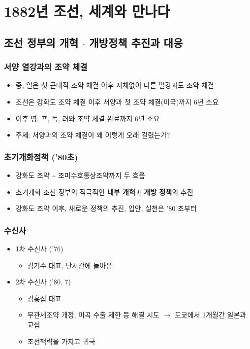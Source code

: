 \section{1882년 조선, 세계와 만나다}

\subsection{조선 정부의 개혁 $\cdot$ 개방정책 추진과 대응}

\subsubsection*{서양 열강과의 조약 체결}
\begin{itemize}
    \item 중, 일은 첫 근대적 조약 체결 이후 지체없이 다른 열강과도 조약 체결
    \item 조선은 강화도 조약 체결 이후 서양과 첫 조약 체결(미국)까지 6년 소요
    \item 이후 영, 프, 독, 러와 조약 체결 완료까지 6년 소요
    \item 주제: 서양과의 조약 체결이 왜 이렇게 오래 걸렸는가?
\end{itemize}

\subsubsection*{초기개화정책 ('80초)}
\begin{itemize}
    \item 강화도 조약 \textasciitilde{} 조미수호통상조약까지 두 흐름
    \item 초기개화 조선 정부의 적극적인 \textbf{내부 개혁}과 \textbf{개방 정책}의 추진
    \item 강화도 조약 이후, 새로운 정책의 추진, 입안, 실천은 '80 초부터
\end{itemize}

\subsubsection*{수신사}
\begin{itemize}
    \item 1차 수신사 ('76)
    \begin{itemize}
        \item 김기수 대표, 단시간에 돌아옴
    \end{itemize}
    \item 2차 수신사 ('80. 7)
    \begin{itemize}
        \item 김홍집 대표
        \item 무관세조약 개정, 미곡 수출 제한 등 해결 시도 $\rightarrow$ 도쿄에서 1개월간 일본과 교섭
        \item 조선책략을 가지고 귀국
    \end{itemize}
\end{itemize}

